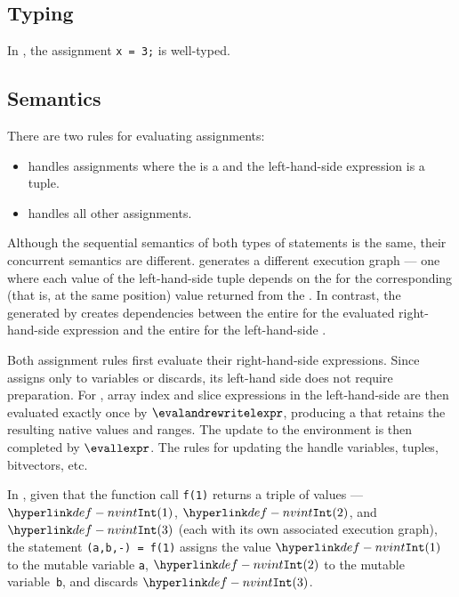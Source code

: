 \subsection{Typing}
In , the assignment \verb|x = 3;|
is well-typed.



\subsection{Semantics}
There are two rules for evaluating assignments:
\begin{itemize}
\item {} handles assignments where the \rhsexpression{}
      is a \callexpressionterm{} and the left-hand-side expression is a tuple.
\item {} handles all other assignments.
\end{itemize}

Although the sequential semantics of both types of statements is the same,
their concurrent semantics are different.
 generates a different execution graph ---
one where each value of the left-hand-side tuple depends on the \executiongraphterm{}
for the corresponding (that is, at the same position) value returned from the \callexpressionterm{}.
In contrast, the \executiongraphterm{} generated by 
creates dependencies between the entire \executiongraphterm{} for the evaluated right-hand-side
expression and the entire \executiongraphterm{} for the left-hand-side \executiongraphterm{}.

Both assignment rules first evaluate their right-hand-side expressions.
Since  assigns only to variables or discards,
its left-hand side does not require preparation.
For , array index and slice expressions in the
left-hand-side \assignableexpression{} are then evaluated exactly once by
$\evalandrewritelexpr$, producing a \preparedassignableexpression{} that retains
the resulting native values and ranges.
%
The update to the environment is then completed by $\evallexpr$.
%
The rules for updating the \assignableexpression{} handle variables, tuples, bitvectors, etc.

In , given that the function call \texttt{f(1)} returns a triple of values ---
$\nvint(1)$, $\nvint(2)$, and $\nvint(3)$
(each with its own associated execution graph),
the statement \texttt{(a,b,-) = f(1)} assigns the value $\nvint(1)$ to the mutable variable \texttt{a},
$\nvint(2)$ to the mutable variable~\texttt{b}, and discards $\nvint(3)$.

